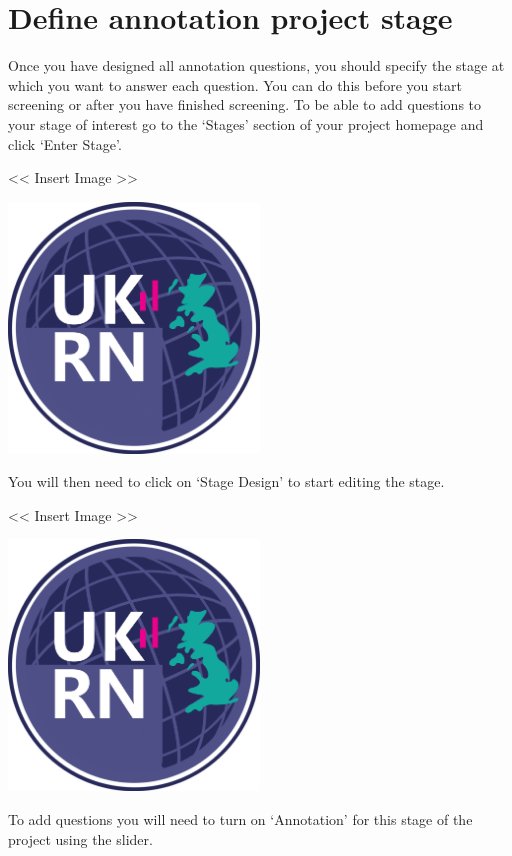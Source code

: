 \documentclass[
]{book}
\begin{document}
\hypertarget{define-annotation-project-stage}{%
\section{Define annotation project stage}\label{define-annotation-project-stage}}

Once you have designed all annotation questions, you should specify the stage at which you want to answer each question. You can do this before you start screening or after you have finished screening.
To be able to add questions to your stage of interest go to the `Stages' section of your project homepage and click `Enter Stage'.

\textless{}\textless{} Insert Image \textgreater{}\textgreater{}

\includegraphics[width=0.5\textwidth,height=0.5\textheight]{figs/evidence-triangle.png}

You will then need to click on `Stage Design' to start editing the stage.

\textless{}\textless{} Insert Image \textgreater{}\textgreater{}

\includegraphics[width=0.5\textwidth,height=0.5\textheight]{figs/evidence-triangle.png}

To add questions you will need to turn on `Annotation' for this stage of the project using the slider.
\end{document}
